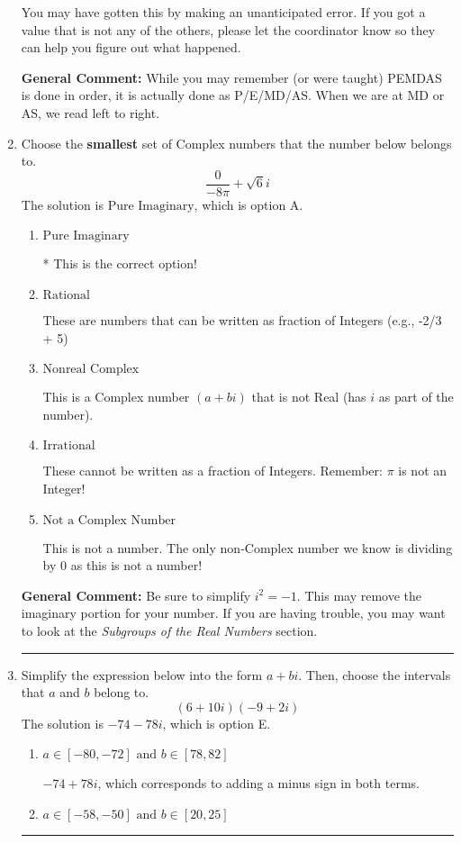 \documentclass{extbook}[14pt]
\newcommand{\litem}[1]{\item #1

\rule{\textwidth}{0.4pt}}
\begin{document}
\begin{enumerate}
{\begin{enumerate}[label=\Alph*.]
 You may have gotten this by making an unanticipated error. If you got a value that is not any of the others, please let the coordinator know so they can help you figure out what happened.
\end{enumerate}

\textbf{General Comment:} While you may remember (or were taught) PEMDAS is done in order, it is actually done as P/E/MD/AS. When we are at MD or AS, we read left to right.
}
\litem{
Choose the \textbf{smallest} set of Complex numbers that the number below belongs to.
\[ \frac{0}{-8 \pi}+\sqrt{6}i \]
The solution is \( \text{Pure Imaginary} \), which is option A.\begin{enumerate}[label=\Alph*.]
\item \( \text{Pure Imaginary} \)

* This is the correct option!
\item \( \text{Rational} \)

These are numbers that can be written as fraction of Integers (e.g., -2/3 + 5)
\item \( \text{Nonreal Complex} \)

This is a Complex number $(a+bi)$ that is not Real (has $i$ as part of the number).
\item \( \text{Irrational} \)

These cannot be written as a fraction of Integers. Remember: $\pi$ is not an Integer!
\item \( \text{Not a Complex Number} \)

This is not a number. The only non-Complex number we know is dividing by 0 as this is not a number!
\end{enumerate}

\textbf{General Comment:} Be sure to simplify $i^2 = -1$. This may remove the imaginary portion for your number. If you are having trouble, you may want to look at the \textit{Subgroups of the Real Numbers} section.
}
\litem{
Simplify the expression below into the form $a+bi$. Then, choose the intervals that $a$ and $b$ belong to.
\[ (6 + 10 i)(-9 + 2 i) \]
The solution is \( -74 - 78 i \), which is option E.\begin{enumerate}[label=\Alph*.]
\item \( a \in [-80, -72] \text{ and } b \in [78, 82] \)

 $-74 + 78 i$, which corresponds to adding a minus sign in both terms.
\item \( a \in [-58, -50] \text{ and } b \in [20, 25] \)


\end{enumerate}}
\end{enumerate}
\end{document}
